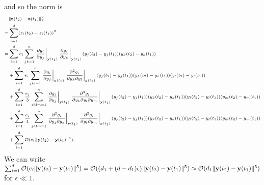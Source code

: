 %
and so the norm is
%
\begin{equation} \label{eq:appendix_z_norm}
\scriptsize
\begin{aligned}
& \|\mathbf{z}(t_2) - \mathbf{z}(t_1)\|_2^2 \\ =&
\sum_{i=1}^d (z_i(t_2) - z_i(t_1))^2 \\
=& \sum_{i=1}^d e_i \sum_{jk=1}^n \left. \frac{\partial g_i}{\partial y_j} \right|_{\mathbf{y}(t_1)} \left. \frac{\partial g_i}{\partial y_k} \right|_{\mathbf{y}(t_1)} (y_j(t_2)-y_j(t_1)) (y_k(t_2)-y_k(t_1)) \\
&+ \sum_{i=1}^d e_i \sum_{jkl=1}^n \left. \frac{\partial g_i}{\partial y_j} \right|_{\mathbf{y}(t_1)} \left. \frac{\partial^2 g_i}{\partial y_k \partial y_l} \right|_{\mathbf{y}(t_1)} (y_j(t_2)-y_j(t_1))  (y_k(t_2)-y_k(t_1)) (y_l(t_2)-y_l(t_1)) \\
&+ \sum_{i=1}^d \frac{e_i}{3} \sum_{jklm=1}^n \left. \frac{\partial g_i}{\partial y_j} \right|_{\mathbf{y}(t_1)} \left. \frac{\partial^3 g_i}{ \partial y_k \partial y_l \partial y_m} \right|_{\mathbf{y}(t_1)} (y_j(t_2)-y_j(t_1)) (y_k(t_2)-y_k(t_1)) (y_l(t_2)-y_l(t_1))(y_m(t_2)-y_m(t_1)) \\
&+ \sum_{i=1}^d \frac{e_i}{4} \sum_{jklm=1}^n \left. \frac{\partial^2 g_i}{\partial y_j \partial y_k} \right|_{\mathbf{y}(t_1)} \left. \frac{\partial^2 g_i}{\partial y_l \partial y_m} \right|_{\mathbf{y}(t_1)} (y_j(t_2)-y_j(t_1)) (y_k(t_2)-y_k(t_1)) (y_l(t_2)-y_l(t_1)) (y_m(t_2)-y_m(t_1)) \\
&+ \sum_{i=1}^d \mathcal{O}( e_i \|\mathbf{y}(t_2) - \mathbf{y}(t_1) \|^5) .
\end{aligned}
\end{equation}
%
We can write $\sum_{i=1}^d \mathcal{O}( e_i \|\mathbf{y}(t_2) - \mathbf{y}(t_1) \|^5) = \mathcal{O}( ({d_1} + (d-{d_1}) \epsilon) \|\mathbf{y}(t_2) - \mathbf{y}(t_1) \|^5) \approx \mathcal{O}( {d_1} \|\mathbf{y}(t_2) - \mathbf{y}(t_1) \|^5)$ for $\epsilon \ll 1$.

